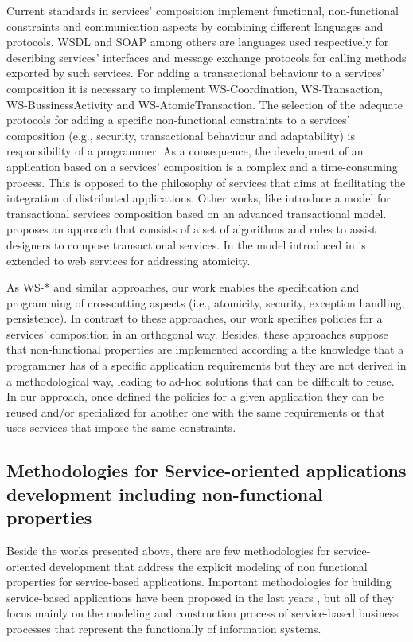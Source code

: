 Current standards in services' composition implement functional, non-functional constraints and communication aspects by combining different languages and protocols. WSDL and SOAP among others are languages used respectively for describing services' interfaces and message exchange protocols for calling methods exported by such services. For adding a transactional behaviour to a services' composition it is necessary to implement WS-Coordination, WS-Transaction, WS-BussinessActivity and WS-AtomicTransaction. The selection of the adequate protocols for adding a specific non-functional constraints to a services' composition (e.g., security, transactional behaviour and adaptability) is responsibility of a programmer. As a consequence, the development of an application based on a services' composition is a complex and a time-consuming process. This is opposed to the philosophy of services that aims at facilitating the integration of distributed applications. Other works, like \cite{Fauvet05} introduce a model for transactional services composition based on an advanced transactional model.\cite{BhiriGP05} proposes an approach that consists of a set of algorithms and rules to assist designers to compose transactional services. In \cite{Vidyasankar:2004} the model introduced in \cite{SchuldtABS02} is extended to web services for addressing atomicity.

As WS-* and similar approaches, our work enables the specification and programming of crosscutting aspects (i.e., atomicity, security, exception handling, persistence).
In contrast to these approaches, our work specifies policies for a services' composition in an orthogonal way. Besides, these approaches suppose that non-functional properties are implemented according a the knowledge that a programmer has of a specific application requirements but they are not derived in a methodological way, leading to ad-hoc solutions that can be difficult to reuse. In our approach, once defined the policies for a given application they can be reused and/or specialized for another one with the same requirements or that uses services that impose the same constraints.

\subsection{Methodologies for Service-oriented applications development including non-functional properties}

Beside the works presented above, there are few methodologies for service-oriented development that address the explicit modeling of non functional properties for service-based applications. Important methodologies for building service-based applications have been proposed in the last years \cite{Ramollari_asurvey,PapazoglouH06,FeuerlichtM05,soma,Arsanjani:2008}, but all of they focus mainly on the modeling and construction process of service-based business processes that represent the functionally of information systems.

